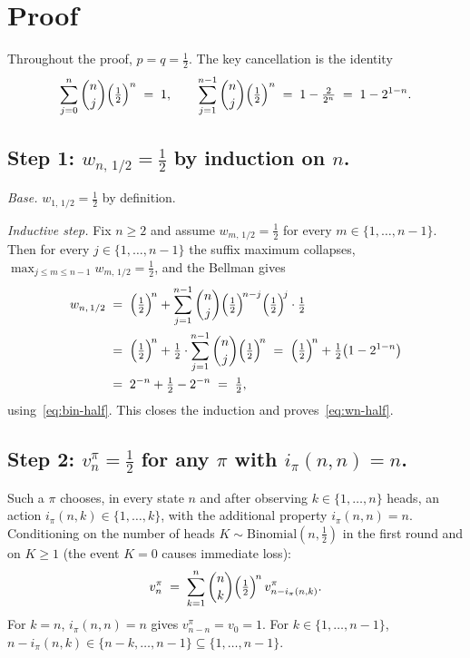 \documentclass{article}
\theoremstyle{remark}
\begin{document}
\section*{Proof}

Throughout the proof, $p=q=\tfrac12$. The key cancellation is the
identity
\begin{equation}\label{eq:bin-half}
  \sum_{j=0}^{n}\binom{n}{j}\Bigl(\tfrac12\Bigr)^{n}\;=\;1,
  \qquad
  \sum_{j=1}^{n-1}\binom{n}{j}\Bigl(\tfrac12\Bigr)^{n}
  \;=\;1-\tfrac{2}{2^{n}}\;=\;1-2^{1-n}.
\end{equation}

\subsection*{Step 1: $w_{n,\,1/2}=\tfrac12$ by induction on $n$.}

\emph{Base.} $w_{1,\,1/2}=\tfrac12$ by definition.

\emph{Inductive step.} Fix $n\ge 2$ and assume $w_{m,\,1/2}=\tfrac12$
for every $m\in\{1,\dots,n-1\}$. Then for every $j\in\{1,\dots,n-1\}$
the suffix maximum collapses,
$\max_{j\le m\le n-1}w_{m,\,1/2}=\tfrac12$, and the Bellman gives
\begin{align*}
  w_{n,\,1/2}
  &\;=\;\Bigl(\tfrac12\Bigr)^{\!n}
       +\sum_{j=1}^{n-1}\binom{n}{j}\Bigl(\tfrac12\Bigr)^{\!n-j}\Bigl(\tfrac12\Bigr)^{\!j}\cdot\tfrac12\\
  &\;=\;\Bigl(\tfrac12\Bigr)^{\!n}
       +\tfrac12\cdot\sum_{j=1}^{n-1}\binom{n}{j}\Bigl(\tfrac12\Bigr)^{\!n}
   \;=\;\Bigl(\tfrac12\Bigr)^{\!n}+\tfrac12\bigl(1-2^{1-n}\bigr)\\
  &\;=\;2^{-n}+\tfrac12-2^{-n}\;=\;\tfrac12,
\end{align*}
using~\eqref{eq:bin-half}. This closes the induction and proves~\eqref{eq:wn-half}.

\subsection*{Step 2: $v_n^\pi=\tfrac12$ for any $\pi$ with $i_\pi(n,n)=n$.}

Such a $\pi$ chooses, in every state $n$ and after observing
$k\in\{1,\dots,n\}$ heads, an action $i_\pi(n,k)\in\{1,\dots,k\}$, with
the additional property $i_\pi(n,n)=n$. Conditioning on the number of
heads $K\sim\mathrm{Binomial}(n,\tfrac12)$ in the first round and on
$K\ge 1$ (the event $K=0$ causes immediate loss):
\[
  v_n^\pi\;=\;\sum_{k=1}^{n}\binom{n}{k}\Bigl(\tfrac12\Bigr)^{\!n}\,
  v_{n-i_\pi(n,k)}^\pi.
\]
For $k=n$, $i_\pi(n,n)=n$ gives $v_{n-n}^\pi=v_0=1$. For
$k\in\{1,\dots,n-1\}$, $n-i_\pi(n,k)\in\{n-k,\dots,n-1\}\subseteq\{1,\dots,n-1\}$.
\end{document}
